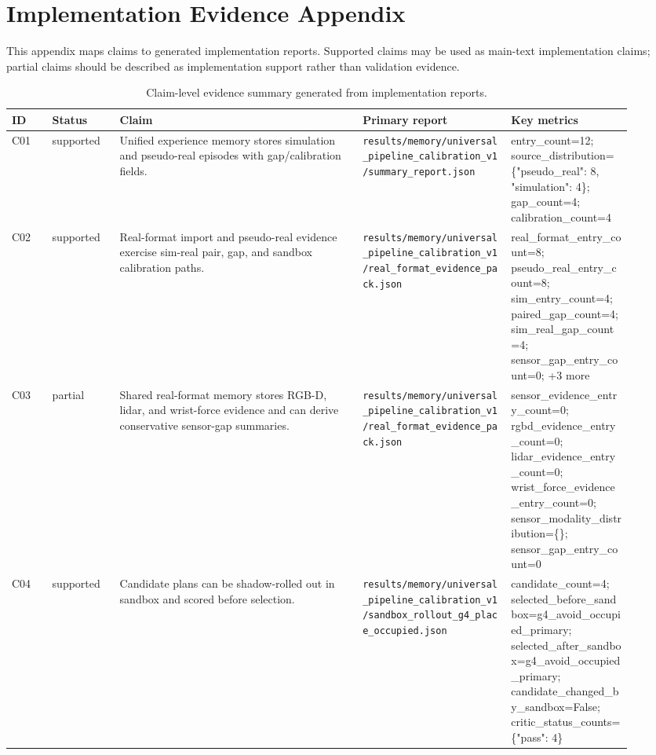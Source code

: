 \appendix
\section{Implementation Evidence Appendix}
This appendix maps claims to generated implementation reports. Supported claims may be used as main-text implementation claims; partial claims should be described as implementation support rather than validation evidence.

\begin{table}[t]
\centering
\small
\caption{Claim-level evidence summary generated from implementation reports.}
\label{tab:claim-evidence-summary}
\begin{tabular}{p{0.06\linewidth}p{0.10\linewidth}p{0.36\linewidth}p{0.22\linewidth}p{0.18\linewidth}}
\hline
ID & Status & Claim & Primary report & Key metrics \\
\hline
C01 & supported & Unified experience memory stores simulation and pseudo-real episodes with gap/calibration fields. & \texttt{results/memory/universal\_pipeline\_calibration\_v1/summary\_report.json} & entry\_count=12; source\_distribution=\{"pseudo\_real": 8, "simulation": 4\}; gap\_count=4; calibration\_count=4 \\
C02 & supported & Real-format import and pseudo-real evidence exercise sim-real pair, gap, and sandbox calibration paths. & \texttt{results/memory/universal\_pipeline\_calibration\_v1/real\_format\_evidence\_pack.json} & real\_format\_entry\_count=8; pseudo\_real\_entry\_count=8; sim\_entry\_count=4; paired\_gap\_count=4; sim\_real\_gap\_count=4; sensor\_gap\_entry\_count=0; +3 more \\
C03 & partial & Shared real-format memory stores RGB-D, lidar, and wrist-force evidence and can derive conservative sensor-gap summaries. & \texttt{results/memory/universal\_pipeline\_calibration\_v1/real\_format\_evidence\_pack.json} & sensor\_evidence\_entry\_count=0; rgbd\_evidence\_entry\_count=0; lidar\_evidence\_entry\_count=0; wrist\_force\_evidence\_entry\_count=0; sensor\_modality\_distribution=\{\}; sensor\_gap\_entry\_count=0 \\
C04 & supported & Candidate plans can be shadow-rolled out in sandbox and scored before selection. & \texttt{results/memory/universal\_pipeline\_calibration\_v1/sandbox\_rollout\_g4\_place\_occupied.json} & candidate\_count=4; selected\_before\_sandbox=g4\_avoid\_occupied\_primary; selected\_after\_sandbox=g4\_avoid\_occupied\_primary; candidate\_changed\_by\_sandbox=False; critic\_status\_counts=\{"pass": 4\} \\

\end{tabular}
\end{table}
